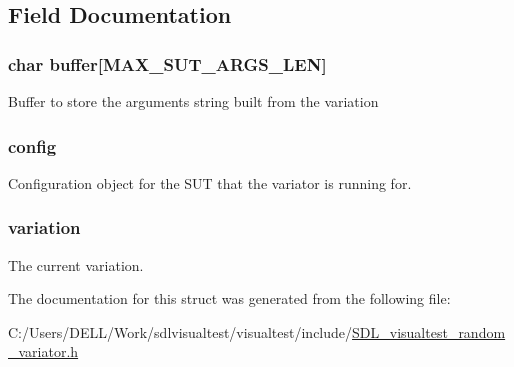 \subsection{Field Documentation}
\hypertarget{struct_s_d_l_visual_test___random_variator_a2b599af5b00be0f525ffc18feb0775a8}{
\subsubsection[{buffer}]{\setlength{\rightskip}{0pt plus 5cm}char buffer\mbox{[}{\bf M\-A\-X\-\_\-\-S\-U\-T\-\_\-\-A\-R\-G\-S\-\_\-\-L\-E\-N}\mbox{]}}}\label{struct_s_d_l_visual_test___random_variator_a2b599af5b00be0f525ffc18feb0775a8}
Buffer to store the arguments string built from the variation \hypertarget{struct_s_d_l_visual_test___random_variator_ab66b4220589b2e2b6e1fde7d6c20bd72}{
\subsubsection[{config}]{ config}}\label{struct_s_d_l_visual_test___random_variator_ab66b4220589b2e2b6e1fde7d6c20bd72}
Configuration object for the S\-U\-T that the variator is running for. \hypertarget{struct_s_d_l_visual_test___random_variator_a11c2995cf19b41c4a1b1f8d9b4081ff7}{
\subsubsection[{variation}]{ variation}}\label{struct_s_d_l_visual_test___random_variator_a11c2995cf19b41c4a1b1f8d9b4081ff7}
The current variation. 

The documentation for this struct was generated from the following file\-:\begin{DoxyCompactItemize}
\item 
C\-:/\-Users/\-D\-E\-L\-L/\-Work/sdlvisualtest/visualtest/include/\hyperlink{_s_d_l__visualtest__random__variator_8h}{S\-D\-L\-\_\-visualtest\-\_\-random\-\_\-variator.\-h}\end{DoxyCompactItemize}
